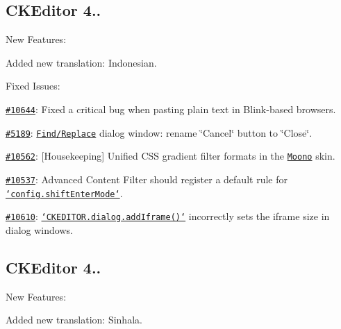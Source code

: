 \subsection*{C\-K\-Editor 4..}

New Features\-:
\begin{DoxyItemize}
\item Added new translation\-: Indonesian.
\end{DoxyItemize}

Fixed Issues\-:
\begin{DoxyItemize}
\item \href{http://dev.ckeditor.com/ticket/10644}{\tt \#10644}\-: Fixed a critical bug when pasting plain text in Blink-\/based browsers.
\item \href{http://dev.ckeditor.com/ticket/5189}{\tt \#5189}\-: \href{http://ckeditor.com/addon/find}{\tt Find/\-Replace} dialog window\-: rename \char`\"{}\-Cancel\char`\"{} button to \char`\"{}\-Close\char`\"{}.
\item \href{http://dev.ckeditor.com/ticket/10562}{\tt \#10562}\-: \mbox{[}Housekeeping\mbox{]} Unified C\-S\-S gradient filter formats in the \href{http://ckeditor.com/addon/moono}{\tt Moono} skin.
\item \href{http://dev.ckeditor.com/ticket/10537}{\tt \#10537}\-: Advanced Content Filter should register a default rule for \href{http://docs.ckeditor.com/#!/api/CKEDITOR.config-cfg-shiftEnterMode}{\tt `config.shift\-Enter\-Mode`}.
\item \href{http://dev.ckeditor.com/ticket/10610}{\tt \#10610}\-: \href{http://docs.ckeditor.com/#!/api/CKEDITOR.dialog-static-method-addIframe}{\tt `\-C\-K\-E\-D\-I\-T\-O\-R.dialog.\-add\-Iframe()`} incorrectly sets the iframe size in dialog windows.
\end{DoxyItemize}

\subsection*{C\-K\-Editor 4..}

New Features\-:
\begin{DoxyItemize}
\item Added new translation\-: Sinhala.
\end{DoxyItemize}

